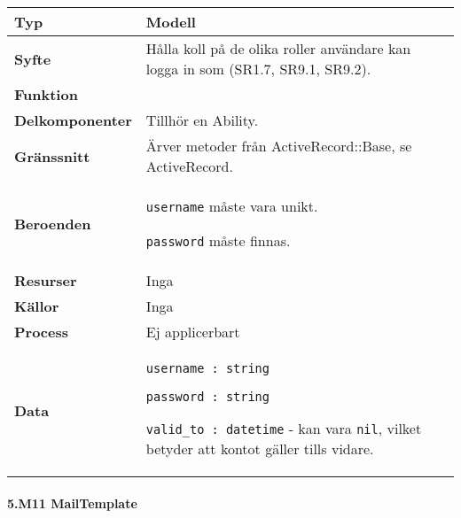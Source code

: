 \documentclass[a4paper, twoside, 11pt, titlepage]{article}
\begin{document}
			\begin {table} [ht] \begin{tabular} {  p{3.5cm} p{11.6cm} }
				\hline
				{\sffamily\textbf{Typ}} & {Modell} \\
				\hline
				{\sffamily\textbf{Syfte}} & {Hålla koll på de olika roller användare kan logga in som (SR1.7, SR9.1, SR9.2).} \\
				\hline
				{\sffamily\textbf{Funktion}} & { } \\
				\hline
				{\sffamily\textbf{Delkomponenter}} & {Tillhör en Ability.} \\
				\hline
				{\sffamily\textbf{Gränssnitt}} & {Ärver metoder från ActiveRecord::Base, se ActiveRecord.} \\
				\hline
				{\sffamily\textbf{Beroenden}} & {{\tt username} måste vara unikt.

{\tt password} måste finnas.} \\
				\hline
				{\sffamily\textbf{Resurser}} & {Inga} \\
				\hline
				{\sffamily\textbf{Källor}} & {Inga} \\
				\hline
				{\sffamily\textbf{Process}} & {Ej applicerbart} \\
				\hline
				{\sffamily\textbf{Data}} & {{\tt username : string}

{\tt password : string}

{\tt valid\_to : datetime} - kan vara {\tt nil}, vilket betyder att kontot gäller tills vidare.} \\
				\hline
			\end{tabular} \end{table} \FloatBarrier


			\paragraph{5.M11 MailTemplate}\
\end{document}
